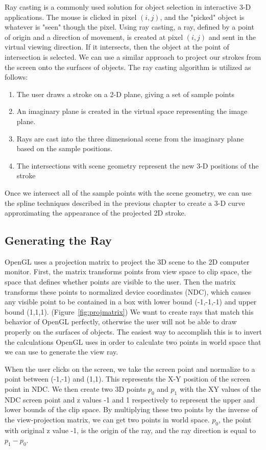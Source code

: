 Ray casting is a commonly used solution for object selection in interactive 3-D applications.
The mouse is clicked in pixel $(i,j)$, and the "picked" object is whatever is "seen" though the pixel.
Using ray casting, a ray, defined by a point of origin and a direction of movement, is created at pixel $(i,j)$ and sent in the virtual viewing direction.
If it intersects, then the object at the point of intersection is selected.
We can use a similar approach to project our strokes from the screen onto the surfaces of objects.
The ray casting algorithm is utilized as follows:
\begin{enumerate}
\item The user draws a stroke on a 2-D plane, giving a set of sample points
\item An imaginary plane is created in the virtual space representing the image plane.
\item Rays are cast into the three dimensional scene from the imaginary plane based on the sample positions.
\item The intersections with scene geometry represent the new 3-D positions of the stroke
\end{enumerate}
Once we intersect all of the sample points with the scene geometry, we can use the spline techniques described in the previous chapter to create a 3-D curve approximating the appearance of the projected 2D stroke.

\subsection{Generating the Ray}

OpenGL uses a projection matrix to project the 3D scene to the 2D computer monitor.
First, the matrix transforms points from view space to clip space, the space that defines whether points are visible to the user.
Then the matrix transforms these points to normalized device coordinates (NDC), which causes any visible point to be contained in a box with lower bound (-1,-1,-1) and upper bound (1,1,1). (Figure~\ref{fig:projmatrix})
We want to create rays that match this behavior of OpenGL perfectly, otherwise the user will not be able to draw properly on the surfaces of objects.
The easiest way to accomplish this is to invert the calculations OpenGL uses in order to calculate two points in world space that we can use to generate the view ray.

When the user clicks on the screen, we take the screen point and normalize to a point between (-1,-1) and (1,1).
This represents the X-Y position of the screen point in NDC.
We then create two 3D points $p_0$ and $p_1$ with the XY values of the NDC screen point and z values -1 and 1 respectively to represent the upper and lower bounds of the clip space.
By multiplying these two points by the inverse of the view-projection matrix, we can get two points in world space.
$p_0$, the point with original z value -1, is the origin of the ray, and the ray direction is equal to $p_1 - p_0$.


